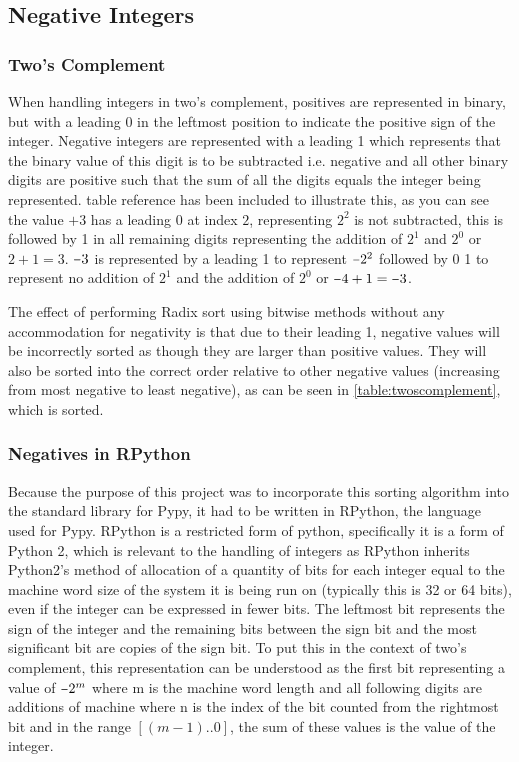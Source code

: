 \documentclass[12pt]{article}
\newcommand{\minus}{\scalebox{0.75}[1.0]{$-$}}
\begin{document}
	\subsection{Negative Integers}
	\label{ssec:negativeintegers}
	\subsubsection{Two's Complement}
	\label{ssec:negativestwos}
	When handling integers in two’s complement, positives are represented in binary, but with a leading 0 in the leftmost position to indicate the positive sign of the integer. Negative integers are represented with a leading 1 which represents that the binary value of this digit is to be subtracted i.e. negative and all other binary digits are positive such that the sum of all the digits equals the integer being represented. table reference has been included to illustrate this, as you can see the value $+3$ has a leading $0$ at index $2$, representing $2^{2}$ is not subtracted, this is followed by 1 in all remaining digits representing the addition of $2^{1}$ and $2^{0}$ or $2+1=3$. $\minus3$ is represented by a leading 1 to represent $\minus2^{2}$ followed by 0 1 to represent no addition of $2^{1}$ and the addition of $2^{0}$ or $\minus4 + 1 = \minus3$.
	\par
	The effect of performing Radix sort using bitwise methods without any accommodation for negativity is that due to their leading 1, negative values will be incorrectly sorted as though they are larger than positive values. They will also be sorted into the correct order relative to other negative values (increasing from most negative to least negative), as can be seen in \autoref{table:twoscomplement}, which is sorted. 	
	\par
	\subsubsection{Negatives in RPython}
  	\label{ssec:pypynegatives}
	Because the purpose of this project was to incorporate this sorting algorithm into the standard library for Pypy, it had to be written in RPython, the language used for Pypy. RPython is a restricted form of python, specifically it is a form of Python 2, which is relevant to the handling of integers as RPython inherits Python2’s method of allocation of a quantity of bits for each integer equal to the machine word size of the system  it is being run on (typically this is 32 or 64 bits), even if the integer can be expressed in fewer bits. The leftmost bit represents the sign of the integer and the remaining bits between the sign bit and the most significant bit are copies of the sign bit. To put this in the context of two’s complement, this representation can be understood as the first bit representing a value of $\minus2^{m}$ where m is the machine word length and all following digits are additions of machine where n is the index of the bit counted from the rightmost bit and in the range $[(m-1)..0]$, the sum of these values is the value of the integer.
	\par
\end{document}
